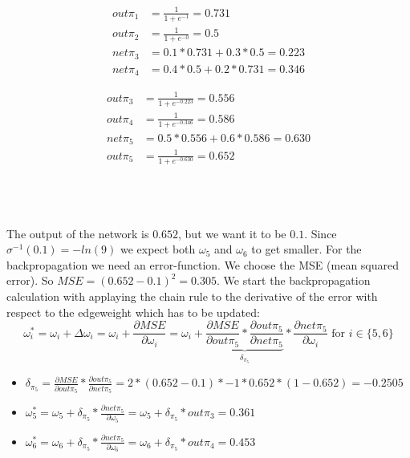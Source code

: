 \noindent\begin{minipage}{.5\linewidth}
	\begin{align*} 
		out\pi_1 &= \frac{1}{1+e^{-1}} = 0.731 \\ 
		out\pi_2 &= \frac{1}{1+e^{-0}} = 0.5 \\
		net\pi_3 &= 0.1*0.731+0.3*0.5 = 0.223 \\
		net\pi_4 &= 0.4*0.5+0.2*0.731 = 0.346
	\end{align*}
\end{minipage}%
\begin{minipage}{.5\linewidth}
	\begin{align*} 
		out\pi_3 &= \frac{1}{1+e^{-0.223}} = 0.556 \\ 
		out\pi_4 &= \frac{1}{1+e^{-0.346}} = 0.586 \\
		net\pi_5 &= 0.5*0.556+0.6*0.586 = 0.630 \\
		out\pi_5 &= \frac{1}{1+e^{-0.630}} = 0.652
	\end{align*}
\end{minipage}\\
\\
\\
The output of the network is $0.652$, but we want it to be $0.1$. Since $\sigma^{-1}(0.1)=-ln(9)$ we expect both $\omega_5$ and $\omega_6$ to get smaller. For the backpropagation we need an error-function. We choose the MSE (mean squared error). So $MSE=(0.652-0.1)^2 = 0.305$. We start the backpropagation calculation with applaying the chain rule to the derivative of the error with respect to the edgeweight which has to be updated:
\begin{equation*}
	\omega_i^* = \omega_i+\Delta \omega_i=\omega_i+\frac{\partial MSE}{\partial \omega_i}=\omega_i+\underbrace{\frac{\partial MSE}{\partial out\pi_5}*\frac{\partial out\pi_5}{\partial net\pi_5}}_{\delta_{\pi_5}}*\frac{\partial net\pi_5}{\partial \omega_i} \text{ for }i \in \{5,6\}
\end{equation*}
\begin{itemize}
	\item $\delta_{\pi_5}=\frac{\partial MSE}{\partial out\pi_5}*\frac{\partial out\pi_5}{\partial net\pi_5}=2*(0.652-0.1)*-1*0.652*(1-0.652)=-0.2505$
	\item $\omega_5^*=\omega_5+\delta_{\pi_5}*\frac{\partial net\pi_5}{\partial \omega_5}=\omega_5+\delta_{\pi_5}*out\pi_3=0.361$
	\item $\omega_6^*=\omega_6+\delta_{\pi_5}*\frac{\partial net\pi_5}{\partial \omega_6}=\omega_6+\delta_{\pi_5}*out\pi_4=0.453$
\end{itemize}
